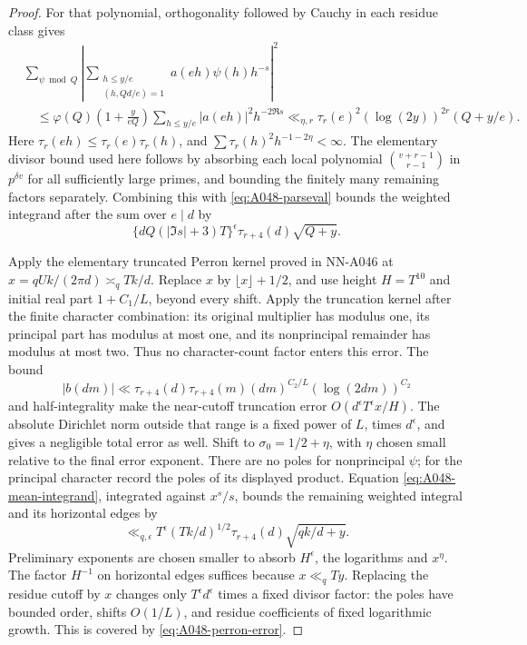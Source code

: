 \begin{proof}
For that polynomial, orthogonality followed by Cauchy
in each residue class gives
\begin{align}
 &\sum_{\psi\bmod Q}
 \left|\sum_{\substack{h\le y/e\\(h,Qd/e)=1}}
                  a(eh)\psi(h)h^{-s}\right|^2\nonumber\\
 &\quad\le
 \varphi(Q)\left(1+\frac{y}{eQ}\right)
                 \sum_{h\le y/e}|a(eh)|^2h^{-2\Re s}
 \ll_{\eta,r}\tau_r(e)^2(\log(2y))^{2r}(Q+y/e).
 \label{eq:A048-polynomial-mean}
\end{align}
Here \(\tau_r(eh)\le\tau_r(e)\tau_r(h)\), and
\(\sum\tau_r(h)^2h^{-1-2\eta}<\infty\).
The elementary divisor bound used here follows by
absorbing each local polynomial \(\binom{v+r-1}{r-1}\)
in \(p^{\delta v}\) for all sufficiently large primes,
and bounding the finitely many remaining factors
separately. Combining this with
\eqref{eq:A048-parseval} bounds the weighted integrand
after the sum over \(e\mid d\) by
\begin{equation}\label{eq:A048-mean-integrand}
 \{dQ(|\Im s|+3)T\}^{\epsilon}
                 \tau_{r+4}(d)\sqrt{Q+y}.
\end{equation}

Apply the elementary truncated Perron kernel proved
in NN-A046 at \(x=qUk/(2\pi d)\asymp_q Tk/d\).
Replace \(x\) by \(\lfloor x\rfloor+1/2\), and use
height \(H=T^{10}\) and initial real part
\(1+C_1/L\), beyond every shift.
Apply the truncation kernel after the finite character combination: its original multiplier has modulus one, its principal part has modulus at most one, and its nonprincipal remainder has modulus at most two. Thus no character-count factor enters this error. The bound
\[
 |b(dm)|\ll \tau_{r+4}(d)\tau_{r+4}(m)
          (dm)^{C_2/L}(\log(2dm))^{C_2}
\]
and half-integrality make the near-cutoff truncation
error \(O(d^\epsilon T^\epsilon x/H)\).
The absolute Dirichlet norm outside that range is
a fixed power of \(L\), times \(d^\epsilon\), and
gives a negligible total error as well.
Shift to \(\sigma_0=1/2+\eta\), with \(\eta\) chosen
small relative to the final error exponent.
There are no poles for nonprincipal \(\psi\);
for the principal character record the poles of
its displayed product. Equation
\eqref{eq:A048-mean-integrand}, integrated against
\(x^s/s\), bounds the remaining weighted integral
and its horizontal edges by
\begin{equation}\label{eq:A048-perron-error}
 \ll_{q,\epsilon} T^\epsilon(Tk/d)^{1/2}
                \tau_{r+4}(d)\sqrt{qk/d+y}.
\end{equation}
Preliminary exponents are chosen smaller to absorb
\(H^\epsilon\), the logarithms and \(x^\eta\).
The factor \(H^{-1}\) on horizontal edges suffices
because \(x\ll_q Ty\).
Replacing the residue cutoff by \(x\) changes only
\(T^\epsilon d^\epsilon\) times a fixed divisor factor:
the poles have bounded order, shifts \(O(1/L)\), and
residue coefficients of fixed logarithmic growth.
This is covered by \eqref{eq:A048-perron-error}.


\end{proof}
